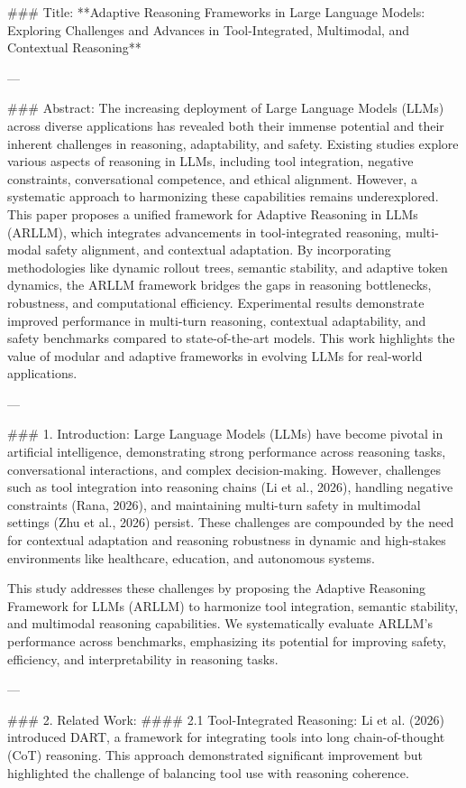 ### Title:
**Adaptive Reasoning Frameworks in Large Language Models: Exploring Challenges and Advances in Tool-Integrated, Multimodal, and Contextual Reasoning**

---

### Abstract:
The increasing deployment of Large Language Models (LLMs) across diverse applications has revealed both their immense potential and their inherent challenges in reasoning, adaptability, and safety. Existing studies explore various aspects of reasoning in LLMs, including tool integration, negative constraints, conversational competence, and ethical alignment. However, a systematic approach to harmonizing these capabilities remains underexplored. This paper proposes a unified framework for Adaptive Reasoning in LLMs (ARLLM), which integrates advancements in tool-integrated reasoning, multi-modal safety alignment, and contextual adaptation. By incorporating methodologies like dynamic rollout trees, semantic stability, and adaptive token dynamics, the ARLLM framework bridges the gaps in reasoning bottlenecks, robustness, and computational efficiency. Experimental results demonstrate improved performance in multi-turn reasoning, contextual adaptability, and safety benchmarks compared to state-of-the-art models. This work highlights the value of modular and adaptive frameworks in evolving LLMs for real-world applications.

---

### 1. Introduction:
Large Language Models (LLMs) have become pivotal in artificial intelligence, demonstrating strong performance across reasoning tasks, conversational interactions, and complex decision-making. However, challenges such as tool integration into reasoning chains (Li et al., 2026), handling negative constraints (Rana, 2026), and maintaining multi-turn safety in multimodal settings (Zhu et al., 2026) persist. These challenges are compounded by the need for contextual adaptation and reasoning robustness in dynamic and high-stakes environments like healthcare, education, and autonomous systems.

This study addresses these challenges by proposing the Adaptive Reasoning Framework for LLMs (ARLLM) to harmonize tool integration, semantic stability, and multimodal reasoning capabilities. We systematically evaluate ARLLM's performance across benchmarks, emphasizing its potential for improving safety, efficiency, and interpretability in reasoning tasks.

---

### 2. Related Work:
#### 2.1 Tool-Integrated Reasoning:
Li et al. (2026) introduced DART, a framework for integrating tools into long chain-of-thought (CoT) reasoning. This approach demonstrated significant improvement but highlighted the challenge of balancing tool use with reasoning coherence.

